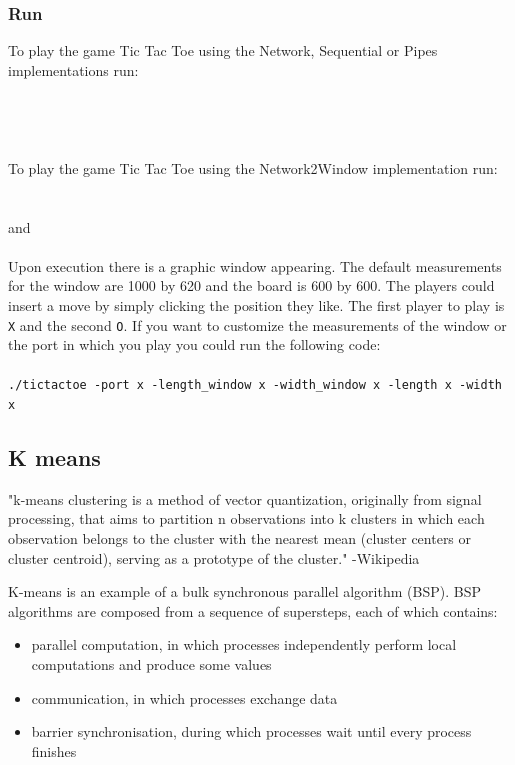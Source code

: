 \documentclass[10pt,a4paper]{article}
\begin{document}
\subsubsection{Run}
To play the game Tic Tac Toe using the Network, Sequential or Pipes implementations run:\\\\
\\
\\\\
To play the game Tic Tac Toe using the Network2Window implementation run:\\\\
\\
 \quad and \quad {}\\\\
Upon execution there is a graphic window appearing. The default measurements for the window are 1000 by 620 and the board is 600 by 600. The players could insert a move by simply clicking the position they like. The first player to play is \texttt{X} and the second \texttt{O}. If you want to customize the measurements of the window or the port in which you play you could run the following code:\\\\
\texttt{./tictactoe -port x -length\_window x -width\_window x -length x -width x}
\subsection{K means}

"k-means clustering is a method of vector quantization, originally from signal processing, that aims to partition n observations into k clusters in which each observation belongs to the cluster with the nearest mean (cluster centers or cluster centroid), serving as a prototype of the cluster."
-Wikipedia

K-means is an example of a bulk synchronous parallel algorithm (BSP). BSP algorithms are composed from a sequence of supersteps, each of which contains:
\begin{itemize}
\item parallel computation, in which processes independently perform local computations and produce some values
\item communication, in which processes exchange data
\item barrier synchronisation, during which processes wait until every process finishes

\end{itemize}
\end{document}
